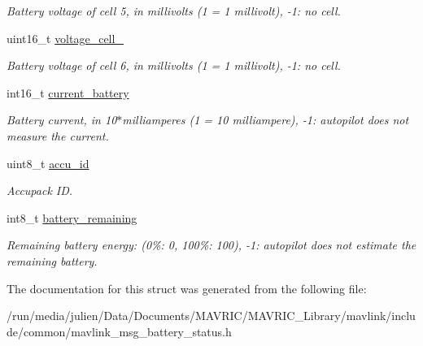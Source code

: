 \begin{DoxyCompactItemize}
\begin{DoxyCompactList}\small\item\em Battery voltage of cell 5, in millivolts (1 = 1 millivolt), -\/1\+: no cell. \end{DoxyCompactList}\item 
\hypertarget{struct____mavlink__battery__status__t_ac1e3680e0cad76eab6833c1c62cfefb5}{uint16\+\_\+t \hyperlink{struct____mavlink__battery__status__t_ac1e3680e0cad76eab6833c1c62cfefb5}{voltage\+\_\+cell\+\_}}\label{struct____mavlink__battery__status__t_ac1e3680e0cad76eab6833c1c62cfefb5}

\begin{DoxyCompactList}\small\item\em Battery voltage of cell 6, in millivolts (1 = 1 millivolt), -\/1\+: no cell. \end{DoxyCompactList}\item 
\hypertarget{struct____mavlink__battery__status__t_a1577349498c9881468031a20cd2faeae}{int16\+\_\+t \hyperlink{struct____mavlink__battery__status__t_a1577349498c9881468031a20cd2faeae}{current\+\_\+battery}}\label{struct____mavlink__battery__status__t_a1577349498c9881468031a20cd2faeae}

\begin{DoxyCompactList}\small\item\em Battery current, in 10$\ast$milliamperes (1 = 10 milliampere), -\/1\+: autopilot does not measure the current. \end{DoxyCompactList}\item 
\hypertarget{struct____mavlink__battery__status__t_afbf96cd532816d0da0228c63dfabce0d}{uint8\+\_\+t \hyperlink{struct____mavlink__battery__status__t_afbf96cd532816d0da0228c63dfabce0d}{accu\+\_\+id}}\label{struct____mavlink__battery__status__t_afbf96cd532816d0da0228c63dfabce0d}

\begin{DoxyCompactList}\small\item\em Accupack I\+D. \end{DoxyCompactList}\item 
\hypertarget{struct____mavlink__battery__status__t_aa2aa73e1a73123460a4da3e3918ca434}{int8\+\_\+t \hyperlink{struct____mavlink__battery__status__t_aa2aa73e1a73123460a4da3e3918ca434}{battery\+\_\+remaining}}\label{struct____mavlink__battery__status__t_aa2aa73e1a73123460a4da3e3918ca434}

\begin{DoxyCompactList}\small\item\em Remaining battery energy\+: (0\%\+: 0, 100\%\+: 100), -\/1\+: autopilot does not estimate the remaining battery. \end{DoxyCompactList}\end{DoxyCompactItemize}


The documentation for this struct was generated from the following file\+:\begin{DoxyCompactItemize}
\item 
/run/media/julien/\+Data/\+Documents/\+M\+A\+V\+R\+I\+C/\+M\+A\+V\+R\+I\+C\+\_\+\+Library/mavlink/include/common/mavlink\+\_\+msg\+\_\+battery\+\_\+status.\+h\end{DoxyCompactItemize}
